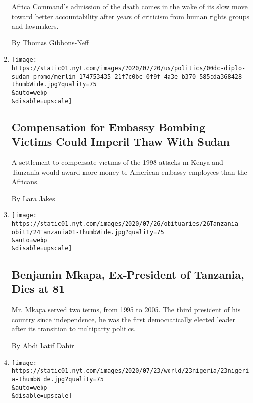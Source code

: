 \begin{enumerate}
  Africa Command's admission of the death comes in the wake of its slow
  move toward better accountability after years of criticism from human
  rights groups and lawmakers.

  By Thomas Gibbons-Neff
\item
  \href{/2020/07/25/us/politics/sudan-compensation-embassy-bombings.html}{}

  \texttt{[image: https://static01.nyt.com/images/2020/07/20/us/politics/00dc-diplo-sudan-promo/merlin\_174753435\_21f7c0bc-0f9f-4a3e-b370-585cda368428-thumbWide.jpg?quality=75\\\&auto=webp\\\&disable=upscale]}

  \hypertarget{compensation-for-embassy-bombing-victims-could-imperil-thaw-with-sudan}{%
  \subsection{Compensation for Embassy Bombing Victims Could Imperil
  Thaw With
  Sudan}\label{compensation-for-embassy-bombing-victims-could-imperil-thaw-with-sudan}}

  A settlement to compensate victims of the 1998 attacks in Kenya and
  Tanzania would award more money to American embassy employees than the
  Africans.

  By Lara Jakes
\item
  \href{/2020/07/24/world/africa/benjamin-mkapa-dead.html}{}

  \texttt{[image: https://static01.nyt.com/images/2020/07/26/obituaries/26Tanzania-obit1/24Tanzania01-thumbWide.jpg?quality=75\\\&auto=webp\\\&disable=upscale]}

  \hypertarget{benjamin-mkapa-ex-president-of-tanzania-dies-at-81}{%
  \subsection{Benjamin Mkapa, Ex-President of Tanzania, Dies at
  81}\label{benjamin-mkapa-ex-president-of-tanzania-dies-at-81}}

  Mr. Mkapa served two terms, from 1995 to 2005. The third president of
  his country since independence, he was the first democratically
  elected leader after its transition to multiparty politics.

  By Abdi Latif Dahir
\item
  \href{/2020/07/23/world/africa/aid-workers-executed-nigeria.html}{}

  \texttt{[image: https://static01.nyt.com/images/2020/07/23/world/23nigeria/23nigeria-thumbWide.jpg?quality=75\\\&auto=webp\\\&disable=upscale]}


\end{enumerate}
